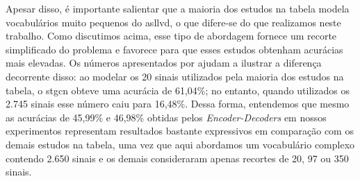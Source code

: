 Apesar disso, é importante salientar que a maioria dos estudos na tabela modela vocabulários muito pequenos do \acrshort{asllvd}, o que difere-se do que realizamos neste trabalho. Como discutimos acima, esse tipo de abordagem fornece um recorte simplificado do problema e favorece para que esses estudos obtenham acurácias mais elevadas.
Os números apresentados por  ajudam a ilustrar a diferença decorrente disso: ao modelar os 20 sinais utilizados pela maioria dos estudos na tabela, o \acrshort{stgcn} obteve uma acurácia de 61,04\%; no entanto, quando utilizados os 2.745 sinais esse número caiu para 16,48\%.
Dessa forma, entendemos que mesmo as acurácias de 45,99\% e 46,98\% obtidas pelos \textit{Encoder-Decoders} em nossos experimentos representam resultados bastante expressivos em comparação com os demais estudos na tabela, uma vez que aqui abordamos um vocabulário complexo contendo 2.650 sinais e os demais consideraram apenas recortes de 20, 97 ou 350 sinais.










